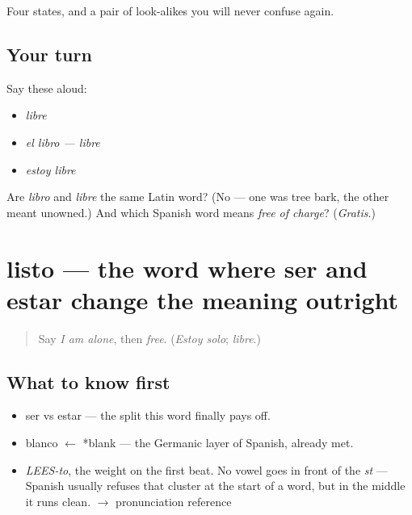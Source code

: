 \begin{grammarlens}[title={What you've built}]
Four states, and a pair of look-alikes you will never confuse again.
\end{grammarlens}

\subsection*{Your turn}
Say these aloud:

\begin{itemize}
\raggedright
  \item \emph{libre}
  \item \emph{el libro — libre}
  \item \emph{estoy libre}
\end{itemize}

\begin{tcolorbox}[breakable,colback=teal!4,colframe=teal!35!black,title={Before you move on}]
Are \emph{libro} and \emph{libre} the same Latin word? (No — one was tree bark, the other meant unowned.) And which Spanish word means \emph{free of charge}? (\emph{Gratis}.)
\end{tcolorbox}
\section[listo]{listo — the word where ser and estar change the meaning outright}

\label{lesson:ES-C326-listo}



\begin{quote}
Say \emph{I am alone}, then \emph{free}. (\emph{Estoy solo}; \emph{libre}.)
\end{quote}

\subsection*{What to know first}
\begin{itemize}
\raggedright
  \item ser vs estar — the split this word finally pays off.
  \item blanco $\leftarrow$ *blank — the Germanic layer of Spanish, already met.
\end{itemize}

\begin{sounds}
\begin{itemize}
\raggedright
  \item \emph{LEES-to}, the weight on the first beat. No vowel goes in front of the \emph{st} — Spanish usually refuses that cluster at the start of a word, but in the middle it runs clean. $\to$ pronunciation reference
\end{itemize}
\end{sounds}

